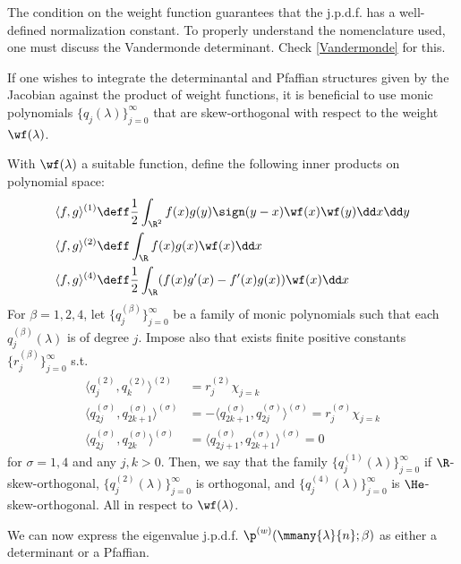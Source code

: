 The condition on the weight function guarantees that the j.p.d.f. has a well-defined normalization constant. To properly understand the nomenclature used, one must discuss the Vandermonde determinant. Check \ref{Vandermonde} for this. 

If one wishes to integrate the determinantal and Pfaffian structures given by the Jacobian against the product of weight functions, it is beneficial to use monic polynomials $\{q_j(\lambda)\}_{j=0}^\infty$ that are skew-orthogonal with respect to the weight $\wf(\lambda)$.

\begin{definicao}
	With $\wf(\lambda)$ a suitable function, define the following inner products on polynomial space:
	\begin{align}
		\langle f,g \rangle^{(1)} & \deff \frac{1}{2} \int_{\R^2} f(x) g(y) \sign(y-x) \wf(x) \wf(y) \dd x \dd y \\
		\langle f,g \rangle^{(2)} & \deff \int_{\R} f(x) g(x) \wf(x) \dd x \\
		\langle f,g \rangle^{(4)} & \deff \frac{1}{2} \int_{\R} (f(x)g'(x) - f'(x)g(x)) \wf(x) \dd x
	\end{align}
	For $\beta = 1,2,4$, let $\{q_j^{(\beta)}\}_{j=0}^\infty$ be a family of monic polynomials such that each $q_j^{(\beta)}(\lambda)$ is of degree $j$. Impose also that exists finite positive constants $\{r_j^{(\beta)}\}_{j=0}^\infty$ s.t.
	\begin{align}
	\langle q_j^{(2)}, q_k^{(2)} \rangle^{(2)} & = r_j^{(2)} \chi_{j=k} \\
	\langle q^{(\sigma)}_{2j}, q^{(\sigma)}_{2k+1} \rangle^{(\sigma)} & = - \langle q^{(\sigma)}_{2k+1}, q^{(\sigma)}_{2j} \rangle^{(\sigma)} = r_j^{(\sigma)} \chi_{j=k} \\
	\langle q^{(\sigma)}_{2j}, q^{(\sigma)}_{2k} \rangle^{(\sigma)} & = \langle q^{(\sigma)}_{2j+1}, q^{(\sigma)}_{2k+1} \rangle^{(\sigma)} = 0
	\end{align}	
	for $\sigma = 1, 4$ and any $j,k>0$. Then, we say that the family $\{q_j^{(1)}(\lambda)\}_{j=0}^\infty$ if $\R$-skew-orthogonal, $\{q_j^{(2)}(\lambda)\}_{j=0}^\infty$ is orthogonal, and $\{q_j^{(4)}(\lambda)\}_{j=0}^\infty$ is $\He$-skew-orthogonal. All in respect to $\wf(\lambda)$.
\end{definicao}

We can now express the eigenvalue j.p.d.f. $\p^{(w)}(\mmany{\lambda}{n};\beta)$ as either a determinant or a Pfaffian. 

